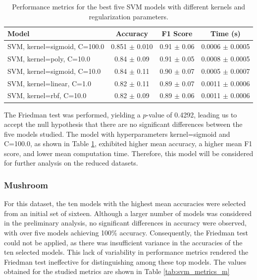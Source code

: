 \begin{table}[h!]
\centering
\begin{tabular}{|l|c|c|c|}
\hline
\textbf{Model} & \textbf{Accuracy} & \textbf{F1 Score} & \textbf{Time (s)} \\
\hline
SVM, kernel=sigmoid, C=100.0 & 0.851 $\pm$ 0.010 & 0.91 $\pm$ 0.06 & 0.0006 $\pm$ 0.0005 \\
\hline
SVM, kernel=poly, C=10.0     & 0.84 $\pm$ 0.09 & 0.91 $\pm$ 0.05 & 0.0008 $\pm$ 0.0005 \\
\hline
SVM, kernel=sigmoid, C=10.0  & 0.84 $\pm$ 0.11 & 0.90 $\pm$ 0.07 & 0.0005 $\pm$ 0.0007 \\
\hline
SVM, kernel=linear, C=1.0    & 0.82 $\pm$ 0.11 & 0.89 $\pm$ 0.07 & 0.0011 $\pm$ 0.0006 \\
\hline
SVM, kernel=rbf, C=10.0      & 0.82 $\pm$ 0.09 & 0.89 $\pm$ 0.06 & 0.0011 $\pm$ 0.0006 \\
\hline
\end{tabular}
\caption{Performance metrics for the best five SVM models with different kernels and regularization parameters.}
\label{tab:svm_metrics}
\end{table}

The Friedman test was performed, yielding a $p$-value of 0.4292, leading us to accept the null hypothesis that there are no significant differences between the five models studied. The model with hyperparameters kernel=sigmoid and C=100.0, as shown in Table \ref{tab:svm_metrics}, exhibited higher mean accuracy, a higher mean F1 score, and lower mean computation time. Therefore, this model will be considered for further analysis on the reduced datasets.

\subsubsection{Mushroom}

For this dataset, the ten models with the highest mean accuracies were selected from an initial set of sixteen. Although a larger number of models was considered in the preliminary analysis, no significant differences in accuracy were observed, with over five models achieving 100$\%$ accuracy. Consequently, the Friedman test could not be applied, as there was insufficient variance in the accuracies of the ten selected models. This lack of variability in performance metrics rendered the Friedman test ineffective for distinguishing among these top models. The values obtained for the studied metrics are shown in Table \ref{tab:svm_metrics_m}

